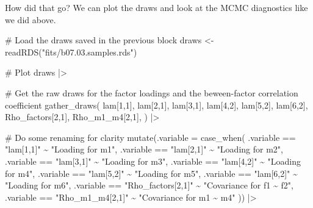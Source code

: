 \documentclass[
  letterpaper,
  DIV=11,
  numbers=noendperiod]{scrreprt}
\newenvironment{Shaded}{\begin{snugshade}}{\end{snugshade}}
\newcommand{\AttributeTok}[1]{\textcolor[rgb]{0.40,0.45,0.13}{#1}}
\newcommand{\CommentTok}[1]{\textcolor[rgb]{0.37,0.37,0.37}{#1}}
\newcommand{\FunctionTok}[1]{\textcolor[rgb]{0.28,0.35,0.67}{#1}}
\newcommand{\NormalTok}[1]{\textcolor[rgb]{0.00,0.23,0.31}{#1}}
\newcommand{\OtherTok}[1]{\textcolor[rgb]{0.00,0.23,0.31}{#1}}
\newcommand{\SpecialCharTok}[1]{\textcolor[rgb]{0.37,0.37,0.37}{#1}}
\newcommand{\StringTok}[1]{\textcolor[rgb]{0.13,0.47,0.30}{#1}}
\begin{document}
How did that go? We can plot the draws and look at the MCMC diagnostics
like we did above.

\begin{Shaded}
\begin{Highlighting}[]
\CommentTok{\# Load the draws saved in the previous block}
\NormalTok{draws }\OtherTok{\textless{}{-}} \FunctionTok{readRDS}\NormalTok{(}\StringTok{"fits/b07.03.samples.rds"}\NormalTok{)}

\CommentTok{\# Plot}
\NormalTok{draws }\SpecialCharTok{|\textgreater{}}

  \CommentTok{\# Get the raw draws for the factor loadings and the beween{-}factor correlation coefficient}
  \FunctionTok{gather\_draws}\NormalTok{(}
   \StringTok{\textasciigrave{}}\AttributeTok{lam[1,1]}\StringTok{\textasciigrave{}}\NormalTok{,}
   \StringTok{\textasciigrave{}}\AttributeTok{lam[2,1]}\StringTok{\textasciigrave{}}\NormalTok{,}
   \StringTok{\textasciigrave{}}\AttributeTok{lam[3,1]}\StringTok{\textasciigrave{}}\NormalTok{,}
   \StringTok{\textasciigrave{}}\AttributeTok{lam[4,2]}\StringTok{\textasciigrave{}}\NormalTok{,}
   \StringTok{\textasciigrave{}}\AttributeTok{lam[5,2]}\StringTok{\textasciigrave{}}\NormalTok{,}
   \StringTok{\textasciigrave{}}\AttributeTok{lam[6,2]}\StringTok{\textasciigrave{}}\NormalTok{,}
   \StringTok{\textasciigrave{}}\AttributeTok{Rho\_factors[2,1]}\StringTok{\textasciigrave{}}\NormalTok{,}
   \StringTok{\textasciigrave{}}\AttributeTok{Rho\_m1\_m4[2,1]}\StringTok{\textasciigrave{}}\NormalTok{,}
\NormalTok{  ) }\SpecialCharTok{|\textgreater{}}

  \CommentTok{\# Do some renaming for clarity}
  \FunctionTok{mutate}\NormalTok{(}\AttributeTok{.variable =} \FunctionTok{case\_when}\NormalTok{(}
\NormalTok{    .variable }\SpecialCharTok{==} \StringTok{"lam[1,1]"} \SpecialCharTok{\textasciitilde{}} \StringTok{"Loading for m1"}\NormalTok{,}
\NormalTok{    .variable }\SpecialCharTok{==} \StringTok{"lam[2,1]"} \SpecialCharTok{\textasciitilde{}} \StringTok{"Loading for m2"}\NormalTok{,}
\NormalTok{    .variable }\SpecialCharTok{==} \StringTok{"lam[3,1]"} \SpecialCharTok{\textasciitilde{}} \StringTok{"Loading for m3"}\NormalTok{,}
\NormalTok{    .variable }\SpecialCharTok{==} \StringTok{"lam[4,2]"} \SpecialCharTok{\textasciitilde{}} \StringTok{"Loading for m4"}\NormalTok{,}
\NormalTok{    .variable }\SpecialCharTok{==} \StringTok{"lam[5,2]"} \SpecialCharTok{\textasciitilde{}} \StringTok{"Loading for m5"}\NormalTok{,}
\NormalTok{    .variable }\SpecialCharTok{==} \StringTok{"lam[6,2]"} \SpecialCharTok{\textasciitilde{}} \StringTok{"Loading for m6"}\NormalTok{,}
\NormalTok{    .variable }\SpecialCharTok{==} \StringTok{"Rho\_factors[2,1]"} \SpecialCharTok{\textasciitilde{}} \StringTok{"Covariance for f1 \textasciitilde{} f2"}\NormalTok{,}
\NormalTok{    .variable }\SpecialCharTok{==} \StringTok{"Rho\_m1\_m4[2,1]"} \SpecialCharTok{\textasciitilde{}} \StringTok{"Covariance for m1 \textasciitilde{} m4"}
\NormalTok{  )) }\SpecialCharTok{|\textgreater{}}


\end{Highlighting}
\end{Shaded}
\end{document}
